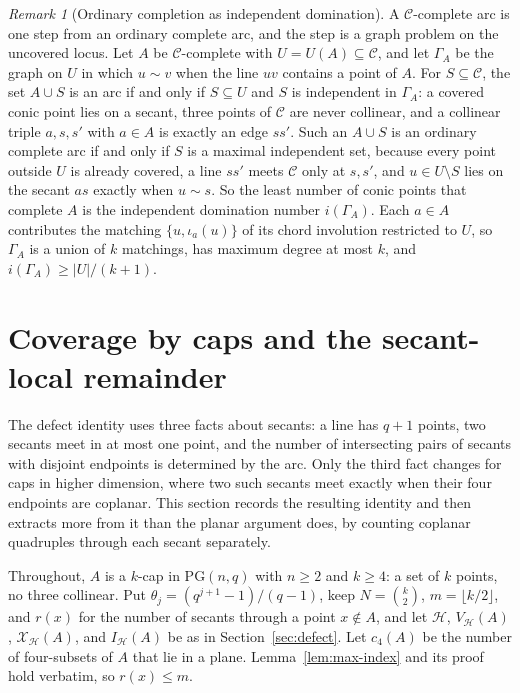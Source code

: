 \documentclass[11pt]{article}
\theoremstyle{definition}
\theoremstyle{remark}
\newtheorem{remark}[theorem]{Remark}
\newcommand{\PG}{\mathrm{PG}}
\newcommand{\cC}{\mathcal{C}}
\newcommand{\cH}{\mathcal{H}}
\newcommand{\cX}{\mathcal{X}}
\newcommand{\IH}{I_{\cH}}
\begin{document}
\begin{remark}[Ordinary completion as independent domination]
\label{rem:independent-domination}
A $\cC$-complete arc is one step from an ordinary complete arc, and the
step is a graph problem on the uncovered locus.  Let $A$ be
$\cC$-complete with $U=U(A)\subseteq\cC$, and let $\Gamma_A$ be the
graph on $U$ in which $u\sim v$ when the line $uv$ contains a point of $A$.
For $S\subseteq\cC$, the set $A\cup S$ is an arc if and only if
$S\subseteq U$ and $S$ is independent in $\Gamma_A$: a covered conic point
lies on a secant, three points of $\cC$ are never collinear, and a
collinear triple $a,s,s'$ with $a\in A$ is exactly an edge $ss'$.  Such an
$A\cup S$ is an ordinary complete arc if and only if $S$ is a maximal
independent set, because every point outside $U$ is already covered, a
line $ss'$ meets $\cC$ only at $s,s'$, and $u\in U\setminus S$ lies on the
secant $as$ exactly when $u\sim s$.  So the least number of conic points
that complete $A$ is the independent domination number $i(\Gamma_A)$.
Each $a\in A$ contributes the matching $\{u,\iota_a(u)\}$ of its chord
involution restricted to $U$, so $\Gamma_A$ is a union of $k$ matchings,
has maximum degree at most $k$, and $i(\Gamma_A)\ge|U|/(k+1)$.
\end{remark}

\section{Coverage by caps and the secant-local remainder}
\label{sec:caps}

The defect identity uses three facts about secants: a line has $q+1$
points, two secants meet in at most one point, and the number of
intersecting pairs of secants with disjoint endpoints is determined by the
arc.  Only the third fact changes for caps in higher dimension, where two
such secants meet exactly when their four endpoints are coplanar.  This
section records the resulting identity and then extracts more from it than
the planar argument does, by counting coplanar quadruples through each
secant separately.

Throughout, $A$ is a $k$-cap in $\PG(n,q)$ with $n\ge2$ and $k\ge4$: a set
of $k$ points, no three collinear.  Put
$\theta_j=(q^{j+1}-1)/(q-1)$, keep $N=\binom{k}{2}$,
$m=\lfloor k/2\rfloor$, and $r(x)$ for the number of secants through a
point $x\notin A$, and let $\cH$, $V_{\cH}(A)$, $\cX_{\cH}(A)$, and
$\IH(A)$ be as in Section~\ref{sec:defect}.  Let $c_4(A)$ be the number
of four-subsets of $A$ that lie in a plane.  Lemma~\ref{lem:max-index} and
its proof hold verbatim, so $r(x)\le m$.
\end{document}
